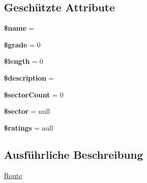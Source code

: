 \subsection*{Geschützte Attribute}
\begin{DoxyCompactItemize}
\item 
\mbox{\label{classCsp_1_1Pinkpoint_1_1Domain_1_1Model_1_1Route_a3a6ca8abf4d2f403a79b0b5940cfd765}} 
{\bfseries \$name} = \textquotesingle{}\textquotesingle{}
\item 
\mbox{\label{classCsp_1_1Pinkpoint_1_1Domain_1_1Model_1_1Route_a59b26bde55c1c24cb863791b2e60c11c}} 
{\bfseries \$grade} = 0
\item 
\mbox{\label{classCsp_1_1Pinkpoint_1_1Domain_1_1Model_1_1Route_a9334f6b4e6f7763f0cb3766a5972e1a3}} 
{\bfseries \$length} = 0
\item 
\mbox{\label{classCsp_1_1Pinkpoint_1_1Domain_1_1Model_1_1Route_a0475ddc64d7099a615a137896763baec}} 
{\bfseries \$description} = \textquotesingle{}\textquotesingle{}
\item 
\mbox{\label{classCsp_1_1Pinkpoint_1_1Domain_1_1Model_1_1Route_a932e5f9ba26a518945bfa53c28b64421}} 
{\bfseries \$sector\+Count} = 0
\item 
\mbox{\label{classCsp_1_1Pinkpoint_1_1Domain_1_1Model_1_1Route_afdd417c491078639bedb7b9a3b0a099d}} 
{\bfseries \$sector} = null
\item 
\mbox{\label{classCsp_1_1Pinkpoint_1_1Domain_1_1Model_1_1Route_a0d71588faf6e9d77c3c5d73c089379bb}} 
{\bfseries \$ratings} = null
\end{DoxyCompactItemize}


\subsection{Ausführliche Beschreibung}
\hyperlink{classCsp_1_1Pinkpoint_1_1Domain_1_1Model_1_1Route}{Route} 

